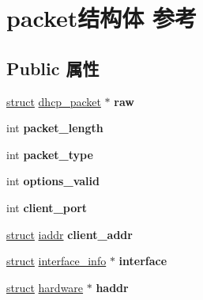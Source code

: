 \hypertarget{structpacket}{}\section{packet结构体 参考}
\label{structpacket}
\subsection*{Public 属性}
\begin{DoxyCompactItemize}
\item 
\mbox{\label{structpacket_a36e854f54a7724e07fd0b9d05b066d5d}} 
\hyperlink{interfacestruct}{struct} \hyperlink{structdhcp__packet}{dhcp\+\_\+packet} $\ast$ {\bfseries raw}
\item 
\mbox{\label{structpacket_a5a1b01f1b457a57458f4202951d301b3}} 
int {\bfseries packet\+\_\+length}
\item 
\mbox{\label{structpacket_ae274c3da775c997c1e9cf00e1c937529}} 
int {\bfseries packet\+\_\+type}
\item 
\mbox{\label{structpacket_adc46740787345c833dca16eae06c7655}} 
int {\bfseries options\+\_\+valid}
\item 
\mbox{\label{structpacket_a334d916eaad0f40ddad3ae488727c203}} 
int {\bfseries client\+\_\+port}
\item 
\mbox{\label{structpacket_aee181f05ff2a672cadadf98f1bb4bba2}} 
\hyperlink{interfacestruct}{struct} \hyperlink{structiaddr}{iaddr} {\bfseries client\+\_\+addr}
\item 
\mbox{\label{structpacket_a6412155e5c030d6d9432253adfa9e8fc}} 
\hyperlink{interfacestruct}{struct} \hyperlink{structinterface__info}{interface\+\_\+info} $\ast$ {\bfseries interface}
\item 
\mbox{\label{structpacket_a0606fe331908310a66e0efe13a372769}} 
\hyperlink{interfacestruct}{struct} \hyperlink{structhardware}{hardware} $\ast$ {\bfseries haddr}
\item 
\mbox{\label{structpacket_a8b1536d4b741dff3a2b90aefa5dc099f}} 

\end{DoxyCompactItemize}
